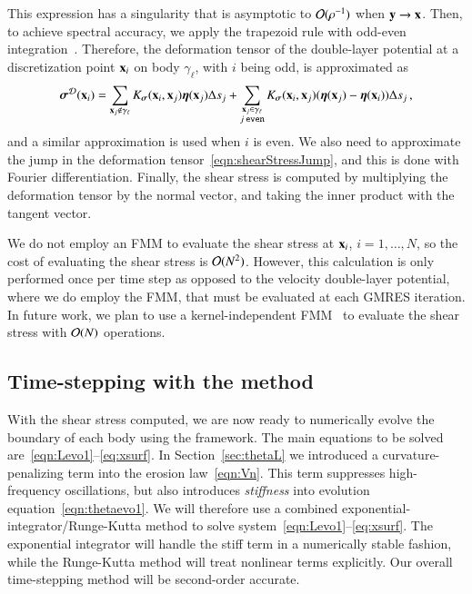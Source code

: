 \documentclass[preprint, 10pt]{elsarticle}
\begin{document}
This expression has a singularity that is asymptotic to ${\mathcal{O}}(\rho^{-1})$ when ${\mathbf{y}} \rightarrow {\mathbf{x}}$.  Then, to achieve spectral accuracy, we apply the trapezoid rule with odd-even integration~\cite{sid-isr1988}.  Therefore, the deformation tensor of the double-layer potential at a discretization point ${\mathbf{x}}_i$ on body $\gamma_\ell$, with $i$ being odd, is approximated as
\begin{align}
  {\boldsymbol\sigma}^{{\mathcal{D}}}({\mathbf{x}}_i) = \sum_{{\mathbf{x}}_j \notin \gamma_\ell}
    K_{\boldsymbol\sigma}({\mathbf{x}}_i,{\mathbf{x}}_j) {\boldsymbol\eta}({\mathbf{x}}_j) \Delta s_j + 
  \sum_{\substack{{\mathbf{x}}_j \in \gamma_\ell \\ j \: \mathtt{even}}}
    K_{\boldsymbol\sigma}({\mathbf{x}}_i,{\mathbf{x}}_j) ({\boldsymbol\eta}({\mathbf{x}}_j) - {\boldsymbol\eta}({\mathbf{x}}_i)) \Delta s_j \, ,
  \label{eqn:stressOddEven}
\end{align}
and a similar approximation is used when $i$ is even.  We also need to approximate the jump in the deformation tensor~\eqref{eqn:shearStressJump}, and this is done with Fourier differentiation.  Finally, the shear stress is computed by multiplying the deformation tensor by the normal vector, and taking the inner product with the tangent vector.

We do not employ an FMM to evaluate the shear stress at ${\mathbf{x}}_i$, $i=1,\ldots,N$, so the cost of evaluating the shear stress is ${\mathcal{O}}(N^2)$.  However, this calculation is only performed once per time step as opposed to the velocity double-layer potential, where we do employ the FMM, that must be evaluated at each GMRES iteration.  In future work, we plan to use a kernel-independent FMM~\cite{yin-bir-zor2004} to evaluate the shear stress with ${\mathcal{O}}(N)$ operations.

\subsection{Time-stepping with the {\thL} method} 
\label{sec:timeStepping}

With the shear stress computed, we are now ready to numerically evolve the boundary of each body using the {\thL} framework. The main equations to be solved are~\eqref{eqn:Levo1}--\eqref{eq:xsurf}.  In Section~\ref{sec:thetaL} we introduced a curvature-penalizing term into the erosion law~\eqref{eqn:Vn}. This term suppresses high-frequency oscillations, but also introduces {\em stiffness} into evolution equation~\eqref{eqn:thetaevo1}. We will therefore use a combined exponential-integrator/Runge-Kutta method to solve system~\eqref{eqn:Levo1}--\eqref{eq:xsurf}. The exponential integrator will handle the stiff term in a numerically stable fashion, while the Runge-Kutta method will treat nonlinear terms explicitly. Our overall time-stepping method will be second-order accurate.
\end{document}
